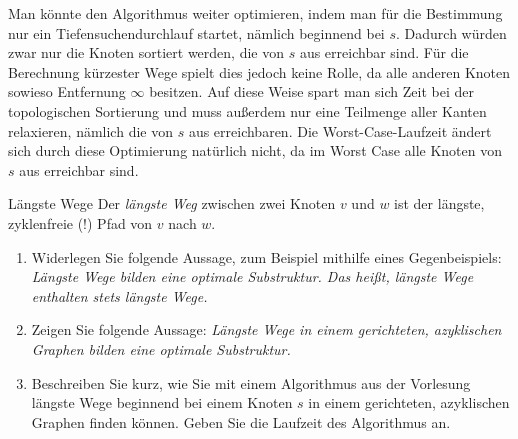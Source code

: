 \documentclass[11pt,a4paper]{article}
\begin{document}
\begin{loesung}
\begin{enumerate}
        Man könnte den Algorithmus weiter optimieren, indem man für die Bestimmung nur ein Tiefensuchendurchlauf startet, nämlich beginnend bei $s$.
        Dadurch würden zwar nur die Knoten sortiert werden, die von $s$ aus erreichbar sind.
        Für die Berechnung kürzester Wege spielt dies jedoch keine Rolle, da alle anderen Knoten sowieso Entfernung $\infty$ besitzen.
        Auf diese Weise spart man sich Zeit bei der topologischen Sortierung und muss außerdem nur eine Teilmenge aller Kanten relaxieren, nämlich die von $s$ aus erreichbaren.
        Die Worst-Case-Laufzeit ändert sich durch diese Optimierung natürlich nicht, da im Worst Case alle Knoten von $s$ aus erreichbar sind.
    \end{enumerate}
\end{loesung}
\begin{aufgabe}{4}{\hard Längste Wege}
    Der \emph{längste Weg} zwischen zwei Knoten $v$ und $w$ ist der längste, zyklenfreie (!) Pfad von $v$ nach $w$.
    \begin{enumerate}[label=\alph*)]
        \item Widerlegen Sie folgende Aussage, zum Beispiel mithilfe eines Gegenbeispiels:
        \emph{Längste Wege bilden eine optimale Substruktur. Das heißt, längste Wege enthalten stets längste Wege.}
        \item\label{longest_path_dag}Zeigen Sie folgende Aussage:
        \emph{Längste Wege in einem gerichteten, azyklischen Graphen bilden eine optimale Substruktur.}
        \item Beschreiben Sie kurz, wie Sie mit einem Algorithmus aus der Vorlesung längste Wege beginnend bei einem Knoten $s$ in einem gerichteten, azyklischen Graphen finden können.
        Geben Sie die Laufzeit des Algorithmus an.
    \end{enumerate}
\end{aufgabe}
\end{document}
